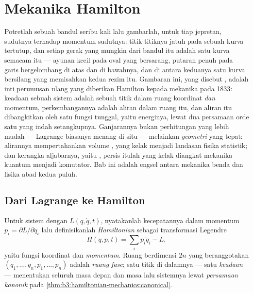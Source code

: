 \chapter{Mekanika Hamilton}\label{ch:b3:hamiltonian-mechanics}

Potretlah sebuah bandul seribu kali lalu gambarlah, untuk tiap jepretan,
sudutnya terhadap momentum sudutnya: titik-titiknya jatuh pada sebuah
kurva tertutup, dan setiap gerak yang mungkin dari bandul itu adalah
satu kurva semacam itu --- ayunan kecil pada oval yang bersarang,
putaran penuh pada garis bergelombang di atas dan di bawahnya, dan di
antara keduanya satu kurva bersilang yang memisahkan kedua rezim itu.
Gambaran ini, yang disebut \emph{}, adalah inti perumusan
ulang yang diberikan Hamilton kepada mekanika pada 1833: keadaan sebuah
sistem adalah sebuah titik dalam ruang koordinat \emph{dan} momentum,
perkembangannya adalah aliran dalam ruang itu, dan aliran itu
dibangkitkan oleh satu fungsi tunggal, yaitu energinya, lewat dua
persamaan orde satu yang indah setangkupnya. Ganjarannya bukan
perhitungan yang lebih mudah --- Lagrange biasanya menang di situ ---
melainkan \emph{geometri} yang tepat: alirannya mempertahankan volume
, yang kelak menjadi landasan fisika statistik; dan kerangka
aljabarnya, yaitu , persis itulah yang kelak diangkat
mekanika kuantum menjadi komutator. Bab ini adalah engsel antara
mekanika benda dan fisika abad kedua puluh.

\section{Dari Lagrange ke Hamilton}

\begin{definition}\label{def:b3:hamiltonian-mechanics:hamiltonian}
Untuk sistem dengan  $L(q, \dot q, t)$, nyatakanlah
kecepatannya dalam momentum $p_i = \partial L/\partial\dot q_i$ lalu
definisikanlah \emph{Hamiltonian} sebagai transformasi Legendre
\[
H(q, p, t) = \sum_i p_i\dot q_i - L ,
\]
yaitu fungsi koordinat dan \emph{momentum}. Ruang berdimensi $2n$ yang
beranggotakan $(q_1, \dots, q_n, p_1, \dots, p_n)$ adalah \emph{ruang
fase}; satu titik di dalamnya --- satu \emph{keadaan} --- menentukan
seluruh masa depan dan masa lalu sistemnya lewat \emph{persamaan
kanonik} pada
\cref{thm:b3:hamiltonian-mechanics:canonical}.
\end{definition}

